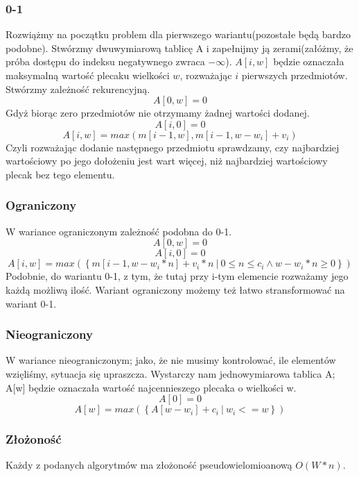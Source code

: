 \subsubsection{0-1}
Rozwiążmy na początku problem dla pierwszego wariantu(pozostałe będą bardzo podobne).
Stwórzmy dwuwymiarową tablicę A i zapełnijmy ją zerami(załóżmy, że próba dostępu do indeksu negatywnego zwraca $-\infty$).
$A[i, w]$ będzie oznaczała maksymalną wartość plecaku wielkości $w$, rozważając $i$ pierwszych przedmiotów.
Stwórzmy zależność rekurencyjną.
\[A[0, w] = 0\]
Gdyż biorąc zero przedmiotów nie otrzymamy żadnej wartości dodanej.
\[A[i, 0] = 0\]
\[A[i, w] = max(m[i - 1, w], m[i - 1, w - w_i] + v_i)\]
Czyli rozważając dodanie następnego przedmiotu sprawdzamy, czy najbardziej wartościowy po jego dołożeniu jest wart więcej, niż najbardziej wartościowy plecak bez tego elementu.

\subsubsection{Ograniczony}
W wariance ograniczonym zależność podobna do 0-1.
\[A[0, w] = 0\]
\[A[i, 0] = 0\]
\[A[i, w] = max(\left \{ m[i - 1, w - w_i * n] + v_i * n ~|~ 0 \leq n \leq c_i \wedge w - w_i * n \geq 0 \right \})\]
Podobnie, do wariantu 0-1, z tym, że tutaj przy i-tym elemencie rozważamy jego każdą możliwą ilość.
Wariant ograniczony możemy też łatwo stransformować na wariant 0-1.

\subsubsection{Nieograniczony}
W wariance nieograniczonym; jako, że nie musimy kontrolować, ile elementów wzięliśmy, sytuacja się upraszcza.
Wystarczy nam jednowymiarowa tablica A; A[w] będzie oznaczała wartość najcennieszego plecaka o wielkości w.
\[A[0] = 0\]
\[A[w] = max(\left \{ A[w - w_i] + c_i ~|~ w_i <= w \right \})\]

\subsubsection{Złożoność}
Każdy z podanych algorytmów ma złożoność pseudowielomioanową $O(W * n)$.
